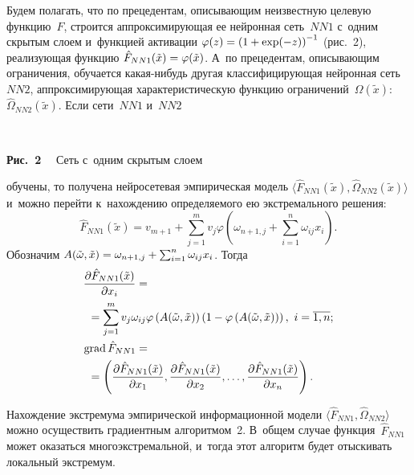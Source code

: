 \begin{multicols}{2}
Будем полагать, что по прецедентам, описывающим неизвестную целевую функцию~$F$, 
строится аппроксимирующая ее нейронная сеть~$NN1$ с~одним скрытым слоем 
и~функцией активации  $\varphi(z)\hm=
\left(1\hm+\exp(-z)\right)^{-1}$ (рис.~2), 
реализующая функцию $\hat{F}_{NN1}(\tilde{x})\hm=\varphi(\tilde{x})$.  
А~по прецедентам, опи\-сы\-ва\-ющим ограничения, обучается ка\-кая-ни\-будь 
другая классифицирующая нейронная сеть~$NN2$, аппроксимирующая 
характеристическую функцию ограничений~$\Omega(\tilde{x})$:
$\hat{\Omega}_{NN2}(\tilde{x})$. Если сети~$NN1$ и~$NN2$\linebreak\vspace*{-12pt}

\renewcommand{\figurename}{\protect\bf Рис.}
\setcounter{figure}{1}

{ \begin{center}  %
 \vspace*{1pt}
    \mbox{%
 \epsfxsize=66.616mm 
 }

\vspace*{6pt}

\noindent
{{\figurename~2}\ \ \small{
Сеть с~одним скрытым слоем 
}}
\end{center}}


\noindent 
обучены, то получена нейросетевая эмпирическая  модель 
$\langle \hat{F}_{NN1}(\tilde{x}), \hat{\Omega}_{NN2}(\tilde{x}) \rangle $ 
и~можно перейти к~нахождению определяемого ею экстремального решения:
$$
\hat{F}_{NN1}(\tilde{x})=v_{m+1}+\sum\limits_{j=1}^m v_j 
\varphi\left(\omega_{n+1,j}+\sum_{i=1}^n\omega_{ij}x_i \right).
$$
Обозначим $A(\tilde{\omega},\tilde{x})\hm=
\omega_{n+1,j}+\sum\nolimits_{i=1}^n\omega_{ij}x_i$. Тогда
\begin{align*}
\fr{\partial \hat{F}_{NN1}(\tilde{x})}{\partial x_i} &={}\\ 
&\hspace*{-15mm}{}=\sum\limits_{j=1}^m v_j \omega_{ij} \varphi
\left(
A(\tilde{\omega},\tilde{x})\right)
\left( 1-\varphi\left(A(\tilde{\omega},\tilde{x})\right)\right), 
\ i=\overline{1,n};
\\
\mathrm{grad}  \,\hat{F}_{NN1} &= {}\\
&\hspace*{-15mm}{}=\left( 
\fr{\partial \hat{F}_{NN1}(\tilde{x})}{\partial x_1}, 
\fr{\partial \hat{F}_{NN1}(\tilde{x})}{\partial x_2}, \dots, 
\fr{\partial \hat{F}_{NN1}(\tilde{x})}{\partial x_n} \right).
\end{align*}

Нахождение экстремума эмпирической информационной модели 
$\langle \hat{F}_{NN1}, \hat{\Omega}_{NN2}\rangle$ 
можно осуществить градиентным алгоритмом~2.
В~общем случае функция~$\hat{F}_{NN1}$ может оказаться многоэкстремальной,
 и~тогда этот алгоритм будет отыскивать локальный экстремум.




\end{multicols}
